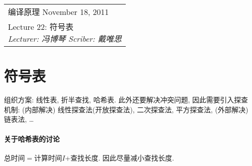 \def\lecture{22}
\clearpage \noindent\begin{tabularx}{\linewidth}{|X|}
\hline \vskip -2mm
{\sf 编译原理} \hfill November 18, 2011 \\
{\centering \sf \large Lecture \lecture:
符号表 \\ }
\textsl{Lecturer: 冯博琴 \hfill Scriber: 戴唯思}\\ \hline
\end{tabularx}
\setcounter{section}{0}
\renewcommand{\thepage}{\lecture -\arabic{page}}

\section{符号表}

    组织方案: 线性表, 折半查找, 哈希表. 此外还要解决冲突问题, 因此需要引入探查机制: (内部解决) 线性探查法(开放探查法), 二次探查法, 平方探查法, (外部解决) 链表法, \ldots

    \paragraph{关于哈希表的讨论}

        总时间$=$计算时间$I$+查找长度. 因此尽量减小查找长度.
